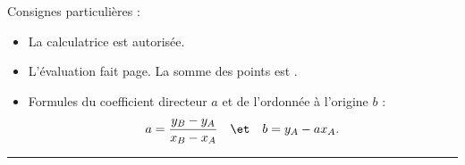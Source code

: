 

\SetDate[10/04/2026]

\reversemarginpar
\setlength{\marginparsep}{.5cm}


\pagestyle{fancy}
\fancyhead[R]{\today}

Consignes particulières : 
\begin{itemize}[label=$\bullet$]
	\item 
	La calculatrice est {autorisée}.
	\item
	L'évaluation fait \pageref{lastpage} page. La somme des points est .
	\item
	Formules du coefficient directeur $a$ et de l'ordonnée à l'origine $b$ :
	\begin{align*}
		a = \dfrac{y_B-y_A}{x_B-x_A} && \et && b =y_A - ax_A.
	\end{align*}
\end{itemize}

\marginpar{[pts]}
\hrule



